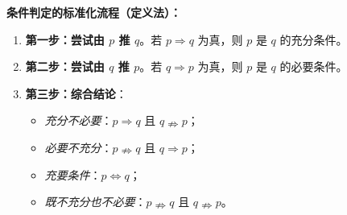 \begin{proofbox}
\textbf{条件判定的标准化流程（定义法）：}
\begin{enumerate}
    \item \textbf{第一步：尝试由 $p$ 推 $q$}。若 $p \Rightarrow q$ 为真，则 $p$ 是 $q$ 的充分条件。
    \item \textbf{第二步：尝试由 $q$ 推 $p$}。若 $q \Rightarrow p$ 为真，则 $p$ 是 $q$ 的必要条件。
    \item \textbf{第三步：综合结论}：
    \begin{itemize}
        \item \textit{充分不必要}：$p \Rightarrow q$ 且 $q \nRightarrow p$；
        \item \textit{必要不充分}：$p \nRightarrow q$ 且 $q \Rightarrow p$；
        \item \textit{充要条件}：$p \Leftrightarrow q$；
        \item \textit{既不充分也不必要}：$p \nRightarrow q$ 且 $q \nRightarrow p$。
    \end{itemize}
\end{enumerate}
\end{proofbox}